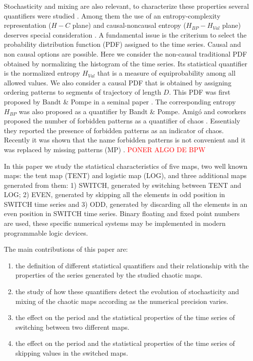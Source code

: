 Stochasticity and mixing are also relevant, to characterize these properties several quantifiers were studied \cite{DeMicco2009}.
Among them the use of an entropy-complexity representation ($H-C$ plane) and causal-noncausal entropy ($H_{BP}-H_{Val}$ plane) deserves special consideration \cite{Rosso2007,DeMicco2008,DeMicco2012,DeMicco2009,Rosso2010,Antonelli2017}.
A fundamental issue is the criterium to select the probability distribution function (PDF) assigned to the time series.
Causal and non causal options are possible.
Here we consider the non-causal traditional PDF obtained by normalizing the histogram of the time series.
Its statistical quantifier is the normalized entropy $H_{Val}$ that is a measure of equiprobability among all allowed values.
We also consider a causal PDF that is obtained by assigning ordering patterns to segments of trajectory of length $D$.
This PDF was first proposed by Bandt \& Pompe in a seminal paper \cite{Bandt2002}.
The corresponding entropy $H_{BP}$ was also proposed as a quantifier by Bandt \& Pompe.
Amig\'o and coworkers proposed the number of forbidden patterns as a quantifier of chaos \cite{Amigo2007a}.
Essentialy they reported the presence of forbidden patterns as an indicator of chaos.
Recently it was shown that the name forbidden patterns is not convenient and it was replaced by missing patterns (MP) \cite{Rosso2012}.
\textcolor{red}{PONER ALGO DE BPW}

In this paper we study the statistical characteristics of five maps, two well known maps: the tent map (TENT) and logistic map (LOG), and three additional maps generated from them: 1) SWITCH, generated by switching between TENT and LOG; 2) EVEN, generated by skipping all the elements in odd position in SWITCH time series and 3) ODD, generated by discarding all the elements in an even position in SWITCH time series.
Binary floating and fixed point numbers are used, these specific numerical systems may be implemented in modern programmable logic devices.

The main contributions of this paper are:
\begin{enumerate}
\item the definition of different statistical quantifiers and their relationship with the properties of the series generated by the studied chaotic maps.
\item the study of how these quantifiers detect the evolution of stochasticity and mixing of the chaotic maps according as the numerical precision varies.
\item the effect on the period and the statistical properties of the time series of switching between two different maps.
\item the effect on the period and the statistical properties of the time series of skipping values in the switched maps.
\end{enumerate}

